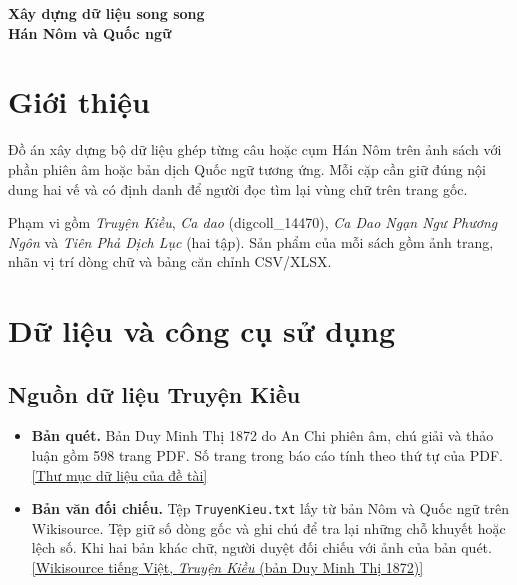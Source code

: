 \documentclass[11pt,a4paper]{article}
\begin{document}
\begin{center}
{\LARGE\bfseries Xây dựng dữ liệu song song\\ Hán Nôm và Quốc ngữ}
\end{center}

\section{Giới thiệu}
Đồ án xây dựng bộ dữ liệu ghép từng câu hoặc cụm Hán Nôm trên ảnh sách với phần phiên âm hoặc bản dịch Quốc ngữ tương ứng. Mỗi cặp cần giữ đúng nội dung hai vế và có định danh để người đọc tìm lại vùng chữ trên trang gốc.

Phạm vi gồm \textit{Truyện Kiều}, \textit{Ca dao} (digcoll\_14470), \textit{Ca Dao Ngạn Ngư Phương Ngôn} và \textit{Tiên Phả Dịch Lục} (hai tập). Sản phẩm của mỗi sách gồm ảnh trang, nhãn vị trí dòng chữ và bảng căn chỉnh CSV/XLSX.

\section{Dữ liệu và công cụ sử dụng}
\subsection*{Nguồn dữ liệu Truyện Kiều}
\begin{itemize}[leftmargin=1.3em,itemsep=4pt,topsep=3pt,parsep=0pt]
\item \textbf{Bản quét.} Bản Duy Minh Thị 1872 do An Chi phiên âm, chú giải và thảo luận gồm 598 trang PDF. Số trang trong báo cáo tính theo thứ tự của PDF. \href{https://drive.google.com/drive/folders/1Pr7seLVvka4jzIsRtrgNLLtrS88EjP6M?usp=drive_link}{[Thư mục dữ liệu của đề tài]}
\item \textbf{Bản văn đối chiếu.} Tệp \texttt{TruyenKieu.txt} lấy từ bản Nôm và Quốc ngữ trên Wikisource. Tệp giữ số dòng gốc và ghi chú để tra lại những chỗ khuyết hoặc lệch số. Khi hai bản khác chữ, người duyệt đối chiếu với ảnh của bản quét. \href{https://vi.wikisource.org/wiki/Truy%E1%BB%87n_Ki%E1%BB%81u_%28b%E1%BA%A3n_Duy_Minh_Th%E1%BB%8B_1872%29}{[Wikisource tiếng Việt, \textit{Truyện Kiều} (bản Duy Minh Thị 1872)]}
\end{itemize}
\end{document}
